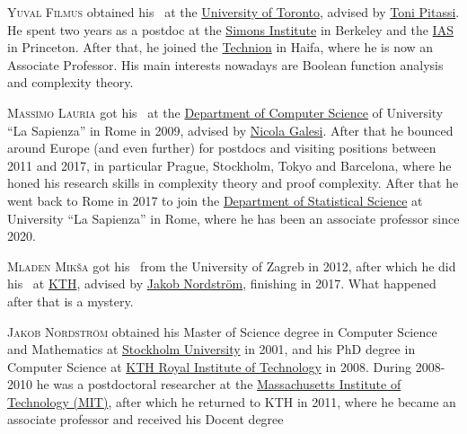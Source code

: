 \documentclass{toc}
\begin{document}
%
\begin{tocaboutauthors}
\begin{tocabout}[filmus] %
  \textsc{Yuval Filmus} obtained his \phd\ at
the  %
\href{https://web.cs.toronto.edu/}{University of Toronto}, advised by \href{https://www.cs.columbia.edu/~toni/}{Toni Pitassi}. He spent two years as a postdoc at the \href{https://simons.berkeley.edu/}{Simons Institute} in Berkeley and the \href{https://www.ias.edu/math/csdm}{IAS} in Princeton. After that, he joined the \href{https://cs.technion.ac.il/}{Technion} in Haifa, where he is now an Associate Professor.  His main interests nowadays are Boolean function analysis and complexity theory.
  
\end{tocabout}
\begin{tocabout}[lauria] %
  \textsc{Massimo Lauria} got his \phd\ at the
  \href{https://www.di.uniroma1.it/}{Department of Computer Science}
  of University ``La Sapienza'' in Rome in 2009, advised by
  \href{https://sites.google.com/diag.uniroma1.it/nicolagalesi}{Nicola Galesi}.
%
  After that he bounced around Europe (and even further) for postdocs
  and visiting positions between 2011 and 2017, in particular Prague,
  Stockholm, Tokyo and Barcelona, where he honed his
  research %
  skills %
  in complexity theory and proof complexity.
%
  After that he went back to
  Rome in 2017 to join the \href{https://www.dss.uniroma1.it/}{Department of
    Statistical Science} at University ``La Sapienza'' in Rome, where
  he has been an associate professor since 2020.
\end{tocabout}
\begin{tocabout}[miksa]
  \textsc{Mladen Mik\v{s}a} %
  got his \msc\ from the University of Zagreb in 2012, after which he did %
  his \phd\ at  %
  \href{http://www.csc.kth.se/}{KTH}, advised by
  \href{http://www.jakobnordstrom.se/}{Jakob Nordström}, %
  finishing in 2017. %
  What
happened
after that is a mystery.
\end{tocabout}
\begin{tocabout}[nordstrom] %
  \textsc{Jakob Nordström} %
obtained his Master of Science degree in Computer
Science and Mathematics at \href{https://su.se}{Stockholm University} in 2001, and his PhD
degree in Computer Science at \href{http://www.kth.se/}{KTH Royal Institute of Technology} in 2008.
During 2008-2010 he was a postdoctoral researcher at the \href{https://mit.edu}{Massachusetts
Institute of Technology (MIT)}, after which he returned to KTH in 2011,
where he became an associate professor and received his Docent degree

\end{tocabout}
\end{tocaboutauthors}
\end{document}
